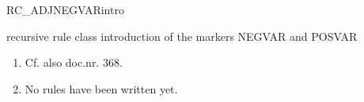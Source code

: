 \begin{mruleclass}{RC\_ADJNEGVARintro}
\begin{classdescr}
\kind recursive rule class
\classtask 
introduction of the markers NEGVAR and POSVAR
\classremarks\mbox{} 

\begin{enumerate}
  \item 
Cf. also doc.nr.  368.
  \item
No rules have been written yet. 
\end{enumerate}
\nofilters

\nospeedrules

\noplannedrules

\norulesnotince


\end{classdescr}
\end{mruleclass}
